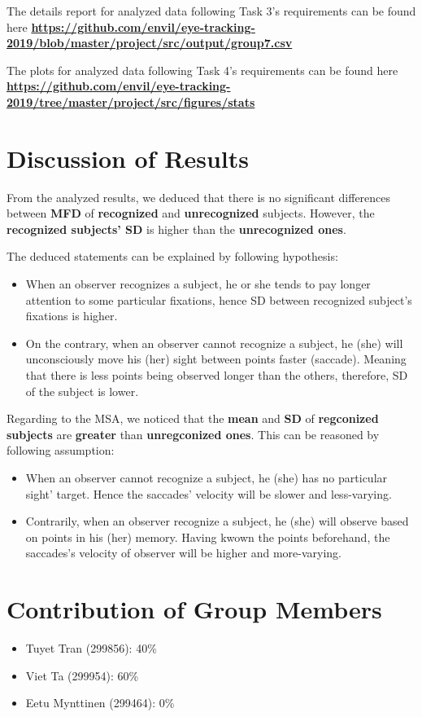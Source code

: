 \documentclass[sigchi-a]{acmart}
\begin{document}
The details report for analyzed data following Task 3's requirements can be found here \textbf{\url{https://github.com/envil/eye-tracking-2019/blob/master/project/src/output/group7.csv}}

The plots for analyzed data following Task 4's requirements can be found here \textbf{\url{https://github.com/envil/eye-tracking-2019/tree/master/project/src/figures/stats}}


\section{Discussion of Results}
From the analyzed results, we deduced that there is no significant differences between \textbf{MFD} of \textbf{recognized} and \textbf{unrecognized} subjects. However, the \textbf{recognized subjects' SD} is higher than the \textbf{unrecognized ones}. 

The deduced statements can be explained by following hypothesis:
\begin{itemize}
    \item When an observer recognizes a subject, he or she tends to pay longer attention to some particular fixations, hence SD between recognized subject's fixations is higher.
    \item On the contrary, when an observer cannot recognize a subject, he (she) will unconsciously move his (her) sight between points faster (saccade). Meaning that there is less points being observed longer than the others, therefore, SD of the subject is lower.
\end{itemize}

Regarding to the MSA, we noticed that the \textbf{mean} and \textbf{SD} of \textbf{regconized subjects} are \textbf{greater} than \textbf{unregconized ones}. This can be reasoned by following assumption:
\begin{itemize}
    \item When an observer cannot recognize a subject, he (she) has no particular sight' target. Hence the saccades' velocity will be slower and less-varying.  
    \item Contrarily, when an observer recognize a subject, he (she) will observe based on points in his (her) memory. Having kwown the points beforehand, the saccades's velocity of observer will be higher and more-varying.
\end{itemize}


\section{Contribution of Group Members}
\begin{itemize}
    \item Tuyet Tran (299856): 40\%
    \item Viet Ta (299954): 60\%
    \item Eetu Mynttinen (299464): 0\%
\end{itemize}
\end{document}
